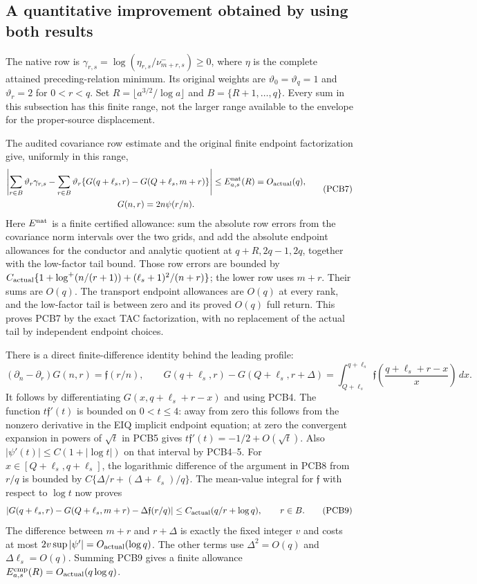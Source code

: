 \documentclass[11pt,a4paper]{article}
\begin{document}
\subsection{A quantitative improvement obtained by using both results}

The native row is
$\gamma_{r,s}=\log(\eta_{r,s}/\nu^-_{m+r,s})\ge0$, where $\eta$
is the complete attained preceding-relation minimum. Its original weights
are $\vartheta_0=\vartheta_q=1$ and $\vartheta_r=2$ for $0<r<q$.
Set $R=\lfloor a^{3/2}/\log a\rfloor$ and $B=\{R+1,\ldots,q\}$.
Every sum in this subsection has this finite range, not the larger range
available to the envelope for the proper-source displacement.

The audited covariance row estimate and the original finite endpoint
factorization give, uniformly in this range,
\[
\begin{gathered}
 \left|\sum_{r\in B}\vartheta_r\gamma_{r,s}
  -\sum_{r\in B}\vartheta_r
    \{G(q+\ell_s,r)-G(Q+\ell_s,m+r)\}\right|
 \le E^{\rm nat}_{a,s}(R)=O_{\rm actual}(q),
 \\ G(n,r)=2n\psi(r/n).
\end{gathered}
 \tag{PCB7}
\]
Here $E^{\rm nat}$ is a finite certified allowance: sum the absolute
row errors from the covariance norm intervals over the two grids, and add
the absolute endpoint allowances for the conductor and analytic quotient
at $q+R,2q-1,2q$, together with the low-factor tail bound. Those row errors
are bounded by
$C_{\rm actual}\{1+\log^+(n/(r+1))+
(\ell_s+1)^2/(n+r)\}$; the lower row uses $m+r$.
Their sums are $O(q)$. The transport endpoint allowances are $O(q)$
at every rank, and the low-factor tail is between zero and its proved
$O(q)$ full return. This proves PCB7 by the exact TAC factorization,
with no replacement of the actual tail by independent endpoint choices.

There is a direct finite-difference identity behind the leading profile:
\[
 (\partial_n-\partial_r)G(n,r)=\mathfrak f(r/n),\qquad
 G(q+\ell_s,r)-G(Q+\ell_s,r+\Delta)
 =\int_{Q+\ell_s}^{q+\ell_s}
  \mathfrak f\!\left(\frac{q+\ell_s+r-x}{x}\right)\,dx.
 \tag{PCB8}
\]
It follows by differentiating $G(x,q+\ell_s+r-x)$ and using PCB4.
The function $t\mathfrak f'(t)$ is bounded on $0<t\le4$:
away from zero this follows from the nonzero derivative in the EIQ
implicit endpoint equation; at zero the convergent expansion in powers
of $\sqrt t$ in PCB5 gives $t\mathfrak f'(t)=-1/2+O(\sqrt t)$.
Also $|\psi'(t)|\le C(1+|\log t|)$ on that interval by PCB4--5.
For $x\in[Q+\ell_s,q+\ell_s]$, the logarithmic difference of the
argument in PCB8 from $r/q$ is bounded by
$C\{\Delta/r+(\Delta+\ell_s)/q\}$. The mean-value integral for
$\mathfrak f$ with respect to $\log t$ now proves
\[
 \left|G(q+\ell_s,r)-G(Q+\ell_s,m+r)
                 -\Delta\mathfrak f(r/q)\right|
 \le C_{\rm actual}(q/r+\log q),\qquad r\in B.
 \tag{PCB9}
\]
The difference between $m+r$ and $r+\Delta$ is exactly the fixed integer
$v$ and costs at most $2v\sup|\psi'|=O_{\rm actual}(\log q)$.
The other terms use $\Delta^2=O(q)$ and $\Delta\ell_s=O(q)$.
Summing PCB9 gives a finite allowance
$E^{\rm cmp}_{a,s}(R)=O_{\rm actual}(q\log q)$.
\end{document}
